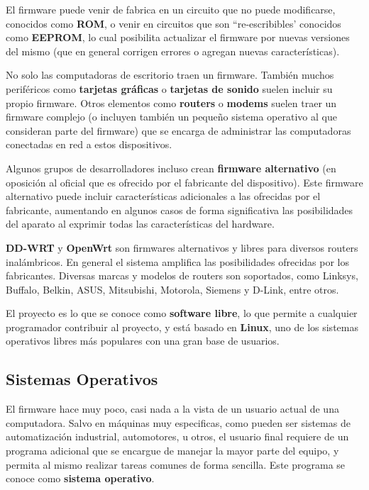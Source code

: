 El firmware puede venir de fabrica en un circuito que no puede modificarse,
conocidos como \textbf{ROM}, o venir en circuitos que son ``re-escribibles'
conocidos como \textbf{EEPROM}, lo cual posibilita actualizar el firmware por
nuevas versiones del mismo (que en general corrigen errores o agregan nuevas
características).

No solo las computadoras de escritorio traen un firmware. También muchos
periféricos como \textbf{tarjetas gráficas} o \textbf{tarjetas de sonido} suelen
incluir su propio firmware. Otros elementos como \textbf{routers} o
\textbf{modems} suelen traer un firmware complejo (o incluyen también un pequeño
sistema operativo al que consideran parte del firmware) que se encarga de
administrar las computadoras conectadas en red a estos dispositivos.

Algunos grupos de desarrolladores incluso crean \textbf{firmware alternativo}
(en oposición al oficial que es ofrecido por el fabricante del dispositivo).
Este firmware alternativo puede incluir características adicionales a las
ofrecidas por el fabricante, aumentando en algunos casos de forma significativa
las posibilidades del aparato al exprimir todas las características del
hardware.

\begin{knowwhat}
    \textbf{DD-WRT} y \textbf{OpenWrt} son firmwares alternativos y libres para
    diversos routers inalámbricos. En general el sistema amplifica las
    posibilidades ofrecidas por los fabricantes. Diversas marcas y modelos de
    routers son soportados, como Linksys, Buffalo, Belkin, ASUS, Mitsubishi,
    Motorola, Siemens y D-Link, entre otros.

    El proyecto es lo que se conoce como \textbf{software libre}, lo que permite
    a cualquier programador contribuir al proyecto, y está basado en
    \textbf{Linux}, uno de los sistemas operativos libres más populares con una
    gran base de usuarios.
\end{knowwhat}


\subsection{Sistemas Operativos}
\label{chap:computadoras:subsec:sistemas_operativos}

El firmware hace muy poco, casi nada a la vista de un usuario actual de una
computadora. Salvo en máquinas muy especificas, como pueden ser sistemas de
automatización industrial, automotores, u otros, el usuario final requiere de un
programa adicional que se encargue de manejar la mayor parte del equipo, y
permita al mismo realizar tareas comunes de forma sencilla. Este programa se
conoce como \textbf{sistema operativo}.

